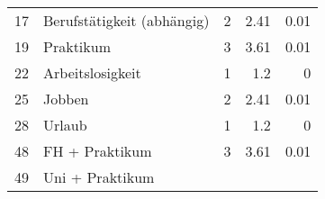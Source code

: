 \begin{longtable}{lXrrr}
     17 &
     \multicolumn{1}{X}{ Berufstätigkeit (abhängig)   } &


       \num{2} &
       \num[round-mode=places,round-precision=2]{2.41} &
         \num[round-mode=places,round-precision=2]{0.01} \\

     19 &
     \multicolumn{1}{X}{ Praktikum   } &


       \num{3} &
       \num[round-mode=places,round-precision=2]{3.61} &
         \num[round-mode=places,round-precision=2]{0.01} \\

     22 &
     \multicolumn{1}{X}{ Arbeitslosigkeit   } &


       \num{1} &
       \num[round-mode=places,round-precision=2]{1.2} &
         \num[round-mode=places,round-precision=2]{0} \\

     25 &
     \multicolumn{1}{X}{ Jobben   } &


       \num{2} &
       \num[round-mode=places,round-precision=2]{2.41} &
         \num[round-mode=places,round-precision=2]{0.01} \\

     28 &
     \multicolumn{1}{X}{ Urlaub   } &


       \num{1} &
       \num[round-mode=places,round-precision=2]{1.2} &
         \num[round-mode=places,round-precision=2]{0} \\

     48 &
     \multicolumn{1}{X}{ FH + Praktikum   } &


       \num{3} &
       \num[round-mode=places,round-precision=2]{3.61} &
         \num[round-mode=places,round-precision=2]{0.01} \\

     49 &
     \multicolumn{1}{X}{ Uni + Praktikum   } &



\end{longtable}
